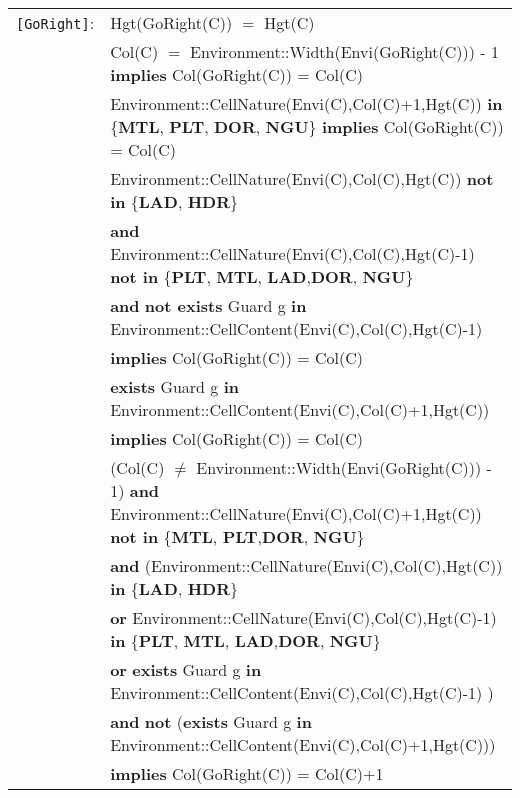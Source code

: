 \documentclass[7pt]{article}
\begin{document}
\begin{tabular}{rl}
\texttt{[GoRight]}: & \textrm{Hgt(GoRight(C))} $=$ \textrm{Hgt(C)} \\
& \textrm{Col(C)} $=$ Environment::Width(Envi(GoRight(C))) - 1 \textbf{implies} \textrm{Col(GoRight(C))} = \textrm{Col(C)} \\
& \textrm{Environment::CellNature(Envi(C),Col(C)+1,Hgt(C))} \textbf{in} \{\textbf{MTL}, \textbf{PLT}, \textbf{DOR}, \textbf{NGU}\} \textbf{implies} \textrm{Col(GoRight(C))} = \textrm{Col(C)} \\
& \textrm{Environment::CellNature(Envi(C),Col(C),Hgt(C))} \textbf{not in} \{\textbf{LAD}, \textbf{HDR}\}
\\ & \quad\quad \textbf{and} \textrm{Environment::CellNature(Envi(C),Col(C),Hgt(C)-1)} \textbf{not in} \{\textbf{PLT}, \textbf{MTL}, \textbf{LAD},\textbf{DOR}, \textbf{NGU}\} \\
& \quad\quad \textbf{and} \textbf{not exists} \textrm{Guard} g \textbf{in} \textrm{Environment::CellContent(Envi(C),Col(C),Hgt(C)-1)} \\
& \quad\quad \textbf{implies} \textrm{Col(GoRight(C))} = \textrm{Col(C)} \\
& \textbf{exists} \textrm{Guard} g \textbf{in} \textrm{Environment::CellContent(Envi(C),Col(C)+1,Hgt(C))} \\ & \quad\quad \textbf{implies} \textrm{Col(GoRight(C))} = \textrm{Col(C)} \\

& (\textrm{Col(C)} $\neq$  Environment::Width(Envi(GoRight(C))) - 1) \textbf{and} \textrm{Environment::CellNature(Envi(C),Col(C)+1,Hgt(C))} \textbf{not in} \{\textbf{MTL}, \textbf{PLT},\textbf{DOR}, \textbf{NGU}\} \\
& \quad\quad \textbf{and} (\textrm{Environment::CellNature(Envi(C),Col(C),Hgt(C))} \textbf{in} \{\textbf{LAD}, \textbf{HDR}\} \\
& \quad\quad\quad\quad \textbf{or} \textrm{Environment::CellNature(Envi(C),Col(C),Hgt(C)-1)} \textbf{in} \{\textbf{PLT}, \textbf{MTL}, \textbf{LAD},\textbf{DOR}, \textbf{NGU}\} \\
& \quad\quad\quad\quad \textbf{or} \textbf{exists} \textrm{Guard} g \textbf{in} \textrm{Environment::CellContent(Envi(C),Col(C),Hgt(C)-1)} ) \\
& \quad\quad \textbf{and} \textbf{not} (\textbf{exists} \textrm{Guard} g \textbf{in} \textrm{Environment::CellContent(Envi(C),Col(C)+1,Hgt(C))}) \\
& \quad\quad \textbf{implies} \textrm{Col(GoRight(C))} = \textrm{Col(C)}+1 \\


\end{tabular}
\end{document}
